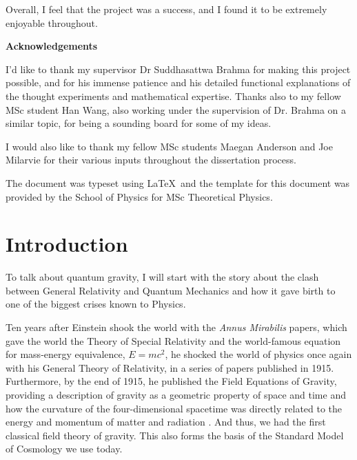 \documentclass[12pt,a4paper]{report}
\theoremstyle{plain}
\theoremstyle{definition}
\theoremstyle{remark}
\begin{document}
Overall, I feel that the project was a success, and I found it to be
extremely enjoyable throughout.


\newpage

\begin{center}
\textbf{Acknowledgements}
\end{center}

I'd like to thank my supervisor Dr Suddhasattwa Brahma for
making this project possible, and for his immense patience and his detailed functional explanations of the thought experiments and mathematical expertise. Thanks also to my fellow MSc student Han Wang, also working under the supervision of Dr. Brahma on a similar topic, for being a sounding board for some of my ideas.

I would also like to thank my fellow MSc students Maegan Anderson and Joe Milarvie for their various inputs throughout the dissertation process.

The document was typeset using \LaTeX\ and the template for this document was provided by the School of Physics for MSc Theoretical Physics.

\newpage
\tableofcontents
\newpage
\listoffigures

\newpage
{}
\chapter{Introduction}

To talk about quantum gravity, I will start with the story about the clash between General Relativity and Quantum Mechanics and how it gave birth to one of the biggest crises known to Physics.

Ten years after Einstein shook the world with the \textit{Annus Mirabilis} papers, which gave the world the Theory of Special Relativity and the world-famous equation for mass-energy equivalence, $E = mc^2$, he shocked the world of physics once again with his General Theory of Relativity, in a series of papers published in 1915. Furthermore, by the end of 1915, he published the Field Equations of Gravity, providing a description of gravity as a geometric property of space and time and how the curvature of the four-dimensional spacetime was directly related to the energy and momentum of matter and radiation \cite{EinsteinFieldEq}. And thus, we had the first classical field theory of gravity. This also forms the basis of the Standard Model of Cosmology we use today.
\end{document}
